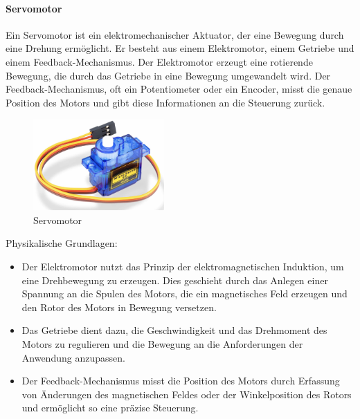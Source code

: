 \paragraph{Servomotor}
Ein Servomotor ist ein elektromechanischer Aktuator, der eine Bewegung durch eine Drehung ermöglicht.
Er besteht aus einem Elektromotor, einem Getriebe und einem Feedback-Mechanismus. Der Elektromotor erzeugt eine rotierende
Bewegung, die durch das Getriebe in eine Bewegung umgewandelt wird. Der
Feedback-Mechanismus, oft ein Potentiometer oder ein Encoder, misst die genaue Position des Motors und gibt diese
Informationen an die Steuerung zurück.\newline %
\begin{figure}[htbp]
	\centering
	\includegraphics[width=5cm]{img/Servomotor}
	\caption{Servomotor}
	\label{fig:Servomotor}
\end{figure}

Physikalische Grundlagen:
\begin{itemize}
	\item Der Elektromotor nutzt das Prinzip der elektromagnetischen Induktion, um eine Drehbewegung zu erzeugen. Dies geschieht
	durch das Anlegen einer Spannung an die Spulen des Motors, die ein magnetisches Feld erzeugen und den Rotor des Motors in
	Bewegung versetzen.
	\item Das Getriebe dient dazu, die Geschwindigkeit und das Drehmoment des Motors zu regulieren und die Bewegung an die
	Anforderungen der Anwendung anzupassen.
	\item Der Feedback-Mechanismus misst die Position des Motors durch Erfassung von Änderungen des magnetischen Feldes oder der
	Winkelposition des Rotors und ermöglicht so eine präzise Steuerung.
\end{itemize}

